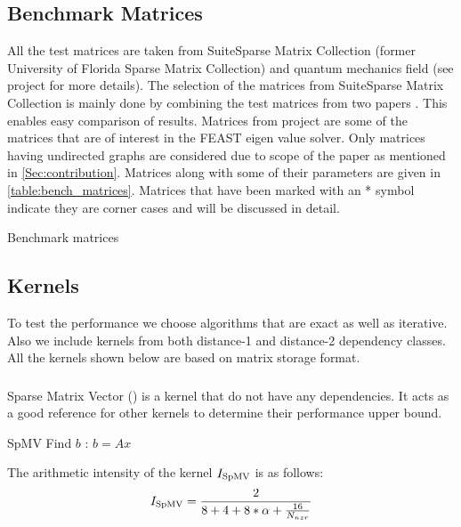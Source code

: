 \subsection{Benchmark Matrices}
All the test matrices are taken from SuiteSparse Matrix Collection (former University of Florida Sparse Matrix Collection) \cite{UOF} and quantum mechanics field (see \ESSEX project \cite{ESSEX} for more details). The selection of the matrices from SuiteSparse Matrix Collection is  mainly done by combining the test matrices from two papers \cite{RSB,park_ls}. This enables easy comparison of results. Matrices from \ESSEX project are some of the matrices that are of interest in the FEAST eigen value solver.  Only matrices having undirected graphs are considered due to scope of the paper as mentioned in \cref{Sec:contribution}. Matrices along with some of their parameters are given in \cref{table:bench_matrices}.  Matrices that have been marked with an * symbol indicate they are corner cases and will be discussed in detail.

\begin{table}[ht]
	\footnotesize
	\caption{Benchmark matrices}\label{tab:test_mtx}
	\label{table:bench_matrices}
	\begin{center}
		
	\end{center}

\end{table}

\subsection{Kernels} \label{subsec:test_kernels}
To test the performance we choose algorithms that are exact as well as iterative. Also we include kernels from both distance-1 and distance-2 dependency classes. All the kernels shown below are based on \CRS matrix storage format.

\subsubsection{\SpMV}
Sparse Matrix Vector (\SpMV) is a kernel that do not have any dependencies. It  acts as a good reference for other kernels to determine their performance upper bound.
\begin{algorithm}[H]
	\caption{SpMV Find $b$ : $b=A x$} 
	\label{alg:SpMV}
	\begin{algorithmic}[1]
		\ENDFOR
		\ENDFOR
	\end{algorithmic}
\end{algorithm}
The arithmetic intensity of the kernel $I_\mathrm{SpMV}$ is as follows:
\begin{equation}
\label{eq:SpMV_intensity}
I_\mathrm{\SpMV} = \frac{2}{8+4+8*\alpha+\frac{16}{\NNZRmath}} \\
\end{equation}

